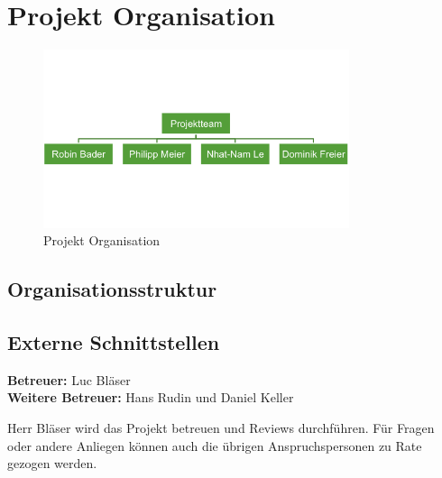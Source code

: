 \chapter{Projekt Organisation}
\begin{figure}[ht]
    \center
    \includegraphics[width=0.8\textwidth]{content/images/projekt_organisation.png}
    \caption{Projekt Organisation}
\end{figure}

\section{Organisationsstruktur}

\section{Externe Schnittstellen}
\textbf{Betreuer:} Luc Bläser
\\
\textbf{Weitere Betreuer:} Hans Rudin und Daniel Keller

Herr Bläser wird das Projekt betreuen und Reviews durchführen. Für Fragen oder andere Anliegen können auch die übrigen Anspruchspersonen zu Rate gezogen werden.
